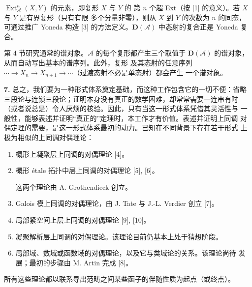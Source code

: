 \clearpage
{}
$\operatorname{Ext}_{\mathcal A}^{n}(X,Y)$ 的元素，即复形 $X$ 与 $Y$ 的
第 $n$ 个超 Ext（按 [1] 的意义）。若 $X$ 与 $Y$ 是有界复形（只有有限
多个分量非零），则从 $X$ 到 $Y$ 的次数为 $n$ 的同态，可通过推广 Yoneda
构造 [3] 的方法定义。$\mathbf D(\mathcal A)$ 中态射的复合正是 Yoneda
复合。

第 4 节研究通常的谱对象。$\mathcal A$ 的每个复形都产生三个取值于
$\mathbf D(\mathcal A)$ 的谱对象，从而自动写出基本的谱序列。此外，复形
及其态射的任意序列
$\cdots\to X_n\to X_{n+1}\to\cdots$（过渡态射不必是单态射）都会产生
一个谱对象。

\noindent\textbf{7.}\quad
总之，我们要为一种形式体系奠定基础，而这种工作包含它的一切不便：省略
三段论与连锁三段论；证明本身没有真正的数学困难，却常常需要一连串有时
（或者说总是）令人厌烦的核验。因此，只有当这一形式体系凭借其灵活性与
一般性，能够表述并证明“真正的”定理时，本工作才有价值。表述并证明上同调
对偶定理的需要，是这一形式体系最初的动力。已知在不同背景下存在若干形式
上极为相似的上同调对偶理论：

\begin{enumerate}
\renewcommand{\labelenumi}{\arabic{enumi})}
\item 概形上凝聚层上同调的对偶理论 [4]。

\item 概形 étale 拓扑中层上同调的对偶理论 [5], [6]。

这两个理论由 A. Grothendieck 创立。

\item Galois 模上同调的对偶理论，由 J. Tate 与 J.-L. Verdier 创立 [7]。

\item 局部紧空间上层上同调的对偶理论 [9], [10]。

\item 凝聚解析层上同调的对偶理论。该理论目前仍基本上处于猜想阶段。

\item 局部域、数域或函数域的对偶理论，以及它与类域论的关系。该理论尚待
发展；最初的步骤由 M. Artin 完成 [8]。
\end{enumerate}

所有这些理论都以联系导出范畴之间某些函子的伴随性质为起点（或终点）。
